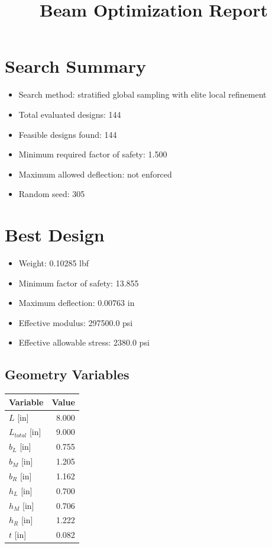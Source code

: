 \documentclass[11pt]{article}
\title{Beam Optimization Report}
\date{}
\begin{document}
\maketitle

\section*{Search Summary}
\begin{itemize}
\item Search method: stratified global sampling with elite local refinement
\item Total evaluated designs: 144
\item Feasible designs found: 144
\item Minimum required factor of safety: 1.500
\item Maximum allowed deflection: not enforced
\item Random seed: 305
\end{itemize}

\section*{Best Design}
\begin{itemize}
\item Weight: 0.10285 lbf
\item Minimum factor of safety: 13.855
\item Maximum deflection: 0.00763 in
\item Effective modulus: 297500.0 psi
\item Effective allowable stress: 2380.0 psi
\end{itemize}

\subsection*{Geometry Variables}
\begin{center}
\begin{tabular}{lr}
\toprule
Variable & Value \\
\midrule
$L$ [in] & 8.000 \\
$L_{total}$ [in] & 9.000 \\
$b_L$ [in] & 0.755 \\
$b_M$ [in] & 1.205 \\
$b_R$ [in] & 1.162 \\
$h_L$ [in] & 0.700 \\
$h_M$ [in] & 0.706 \\
$h_R$ [in] & 1.222 \\
$t$ [in] & 0.082 \\
\bottomrule
\end{tabular}
\end{center}
\end{document}
